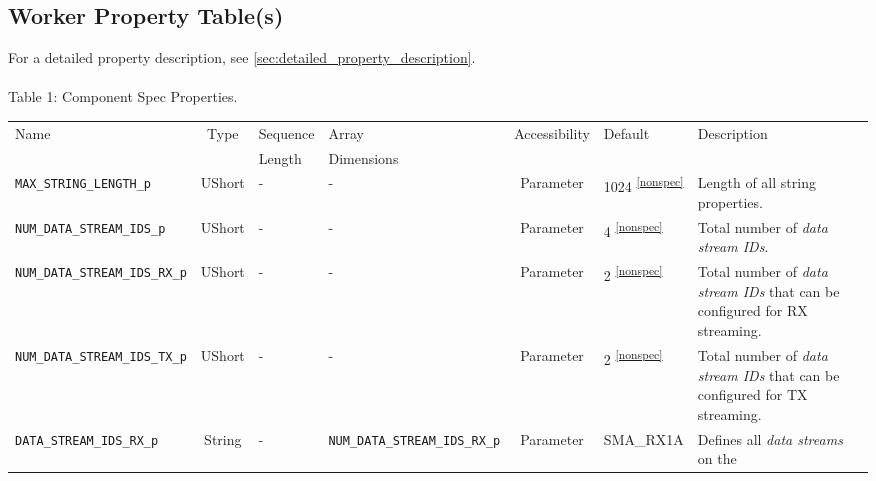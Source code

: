 \documentclass{article}
\begin{document}

\begin{landscape}

\section{Worker Property Table(s)}
  For a detailed property description, see \ref{sec:detailed_property_description}. \\ \\

	\noindent Table \hypertarget{tab1}{1}: Component Spec Properties.
	\begin{scriptsize}
		\begin{longtable}{|p{5.16cm}|c|p{3.5cm}|p{3.4cm}|c|p{2.1cm}|p{3.75cm}|}
			\hline
			\rowcolor{blue}
			Name                                & Type   & Sequence & Array      & Accessibility       & Default & Description                                                                                \\
			\rowcolor{blue}
			                                    &        & Length   & Dimensions &                     &             &                                                                                            \\
			\hline
			\verb+MAX_STRING_LENGTH_p+ & UShort & -        & -          & Parameter           & 1024 \textsuperscript{\ref{nonspec}}  & Length of all string properties. \\
			\hline
			\verb+NUM_DATA_STREAM_IDS_p+           & UShort & -        & -          & Parameter           & 4 \textsuperscript{\ref{nonspec}}       & Total number of \textit{data stream IDs}. \\
			\hline
			\verb+NUM_DATA_STREAM_IDS_RX_p+        & UShort & -        & -          & Parameter           & 2 \textsuperscript{\ref{nonspec}}       & Total number of \textit{data stream IDs} that can be configured for RX streaming. \\
			\hline
			\verb+NUM_DATA_STREAM_IDS_TX_p+        & UShort & -        & -          & Parameter           & 2 \textsuperscript{\ref{nonspec}}       & Total number of \textit{data stream IDs} that can be configured for TX streaming. \\
			\hline
			\verb+DATA_STREAM_IDS_RX_p+        & String & -        & \verb+NUM_DATA_STREAM_IDS_RX_p+ & Parameter           & SMA\_RX1A & Defines all \textit{data streams} on the  \\

\end{longtable}
\end{scriptsize}
\end{landscape}
\end{document}
